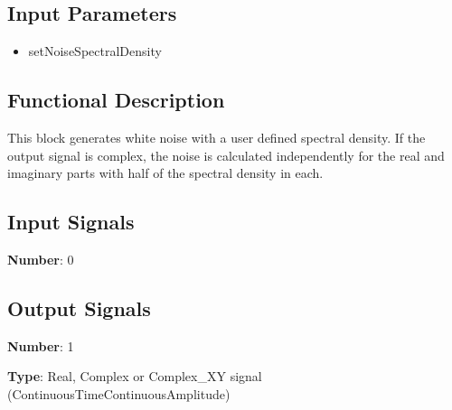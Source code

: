 \documentclass[../../sdf/tex/BPSK_system.tex]{subfiles}
\date{}
\begin{document}
\onlyinsubfile{\maketitle}

\subsection*{Input Parameters}

\begin{multicols}{2}
	\begin{itemize}
		\item setNoiseSpectralDensity
	\end{itemize}
\end{multicols}

\subsection*{Functional Description}

This block generates white noise with a user defined spectral density. If the output signal is complex, the noise is calculated independently for the real and imaginary parts with half of the spectral density in each.


\subsection*{Input Signals}

\textbf{Number}: 0

\subsection*{Output Signals}

\textbf{Number}: 1

\textbf{Type}: Real, Complex or Complex\_XY signal (ContinuousTimeContinuousAmplitude)
\end{document}
